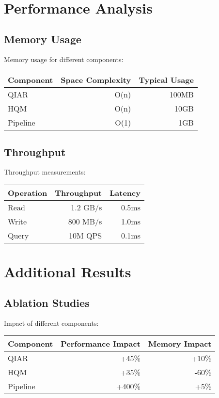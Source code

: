 \documentclass[10pt]{article}
\begin{document}
\section{Performance Analysis}

\subsection{Memory Usage}

Memory usage for different components:

\begin{table}[h]
\centering
\begin{tabular}{lrr}
\toprule
Component & Space Complexity & Typical Usage \\
\midrule
QIAR & O(n) & 100MB \\
HQM & O(n) & 10GB \\
Pipeline & O(1) & 1GB \\
\bottomrule
\end{tabular}
\end{table}

\subsection{Throughput}

Throughput measurements:

\begin{table}[h]
\centering
\begin{tabular}{lrr}
\toprule
Operation & Throughput & Latency \\
\midrule
Read & 1.2 GB/s & 0.5ms \\
Write & 800 MB/s & 1.0ms \\
Query & 10M QPS & 0.1ms \\
\bottomrule
\end{tabular}
\end{table}

\section{Additional Results}

\subsection{Ablation Studies}

Impact of different components:

\begin{table}[h]
\centering
\begin{tabular}{lrr}
\toprule
Component & Performance Impact & Memory Impact \\
\midrule
QIAR & +45\% & +10\% \\
HQM & +35\% & -60\% \\
Pipeline & +400\% & +5\% \\
\bottomrule
\end{tabular}
\end{table}
\end{document}

